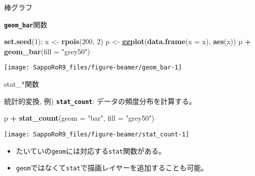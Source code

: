 \documentclass[ignorenonframetext,]{beamer}
\newenvironment{Shaded}{\begin{snugshade}}{\end{snugshade}}
\newcommand{\KeywordTok}[1]{\textcolor[rgb]{0.13,0.29,0.53}{\textbf{#1}}}
\newcommand{\DataTypeTok}[1]{\textcolor[rgb]{0.13,0.29,0.53}{#1}}
\newcommand{\DecValTok}[1]{\textcolor[rgb]{0.00,0.00,0.81}{#1}}
\newcommand{\StringTok}[1]{\textcolor[rgb]{0.31,0.60,0.02}{#1}}
\newcommand{\OperatorTok}[1]{\textcolor[rgb]{0.81,0.36,0.00}{\textbf{#1}}}
\newcommand{\NormalTok}[1]{#1}
\providecommand{\tightlist}{%
  \setlength{\itemsep}{0pt}\setlength{\parskip}{0pt}}
\let\oldShaded\Shaded
\let\endoldShaded\endShaded
\renewenvironment{Shaded}{\footnotesize\oldShaded}{\endoldShaded}
\begin{document}
\begin{frame}[fragile]{棒グラフ}

\textbf{\texttt{geom\_bar}}関数

\begin{Shaded}
\begin{Highlighting}[]
\KeywordTok{set.seed}\NormalTok{(}\DecValTok{1}\NormalTok{); x <-}\StringTok{ }\KeywordTok{rpois}\NormalTok{(}\DecValTok{200}\NormalTok{, }\DecValTok{2}\NormalTok{)}
\NormalTok{p <-}\StringTok{ }\KeywordTok{ggplot}\NormalTok{(}\KeywordTok{data.frame}\NormalTok{(}\DataTypeTok{x =}\NormalTok{ x), }\KeywordTok{aes}\NormalTok{(x))}
\NormalTok{p }\OperatorTok{+}\StringTok{ }\KeywordTok{geom_bar}\NormalTok{(}\DataTypeTok{fill =} \StringTok{"grey50"}\NormalTok{)}
\end{Highlighting}
\end{Shaded}

\texttt{[image: SappoRoR9\_files/figure-beamer/geom\_bar-1]}

\end{frame}

\begin{frame}[fragile]{stat\_*関数}

統計的変換, 例) \textbf{\texttt{stat\_count}}:
データの頻度分布を計算する。

\begin{Shaded}
\begin{Highlighting}[]
\NormalTok{p }\OperatorTok{+}\StringTok{ }\KeywordTok{stat_count}\NormalTok{(}\DataTypeTok{geom =} \StringTok{"bar"}\NormalTok{, }\DataTypeTok{fill =} \StringTok{"grey50"}\NormalTok{)}
\end{Highlighting}
\end{Shaded}

\texttt{[image: SappoRoR9\_files/figure-beamer/stat\_count-1]}

\begin{itemize}
\tightlist
\item
  たいていの\texttt{geom}には対応する\texttt{stat}関数がある。
\item
  \texttt{geom}ではなくて\texttt{stat}で描画レイヤーを追加することも可能。
\end{itemize}

\end{frame}
\end{document}
